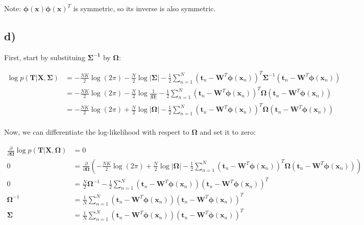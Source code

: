 \documentclass[12pt,a4paper,oneside]{paper}
\begin{document}
Note: $\mathbf{\phi}(\bm{x}) \mathbf{\phi}(\bm{x})^T$ is symmetric, so its inverse is also symmetric.

\newpage
\subsection*{d)}

First, start by substituing \( \mathbf{\Sigma^{-1}} \) by $\mathbf{\Omega}$:

\begin{align*}
\log p(\mathbf{T} | \mathbf{X}, \mathbf{\Sigma}) &= -\frac{NK}{2} \log(2\pi) - \frac{N}{2} \log |\mathbf{\Sigma}| - \frac{1}{2} \sum_{n=1}^{N} (\bm{t}_n - \mathbf{W}^T \mathbf{\phi}(\bm{x}_n))^T \mathbf{\Sigma}^{-1} (\bm{t}_n - \mathbf{W}^T \mathbf{\phi}(\bm{x}_n)) \\
&= -\frac{NK}{2} \log(2\pi) - \frac{N}{2} \log \frac{1}{|\mathbf{\Omega}|} - \frac{1}{2} \sum_{n=1}^{N} (\bm{t}_n - \mathbf{W}^T \mathbf{\phi}(\bm{x}_n))^T \mathbf{\Omega} (\bm{t}_n - \mathbf{W}^T \mathbf{\phi}(\bm{x}_n)) \\
&= -\frac{NK}{2} \log(2\pi) + \frac{N}{2} \log |\mathbf{\Omega}| - \frac{1}{2} \sum_{n=1}^{N} (\bm{t}_n - \mathbf{W}^T \mathbf{\phi}(\bm{x}_n))^T \mathbf{\Omega} (\bm{t}_n - \mathbf{W}^T \mathbf{\phi}(\bm{x}_n)) \\
\end{align*}

Now, we can differentiate the log-likelihood with respect to \( \mathbf{\Omega} \) and set it to zero:

\begin{align*}
\frac{\partial}{\partial \mathbf{\Omega}} \log p(\mathbf{T} | \mathbf{X}, \mathbf{\Omega}) &= 0 \\
0 &= \frac{\partial}{\partial \mathbf{\Omega}} \left( -\frac{NK}{2} \log(2\pi) + \frac{N}{2} \log |\mathbf{\Omega}| - \frac{1}{2} \sum_{n=1}^{N} (\bm{t}_n - \mathbf{W}^T \mathbf{\phi}(\bm{x}_n))^T \mathbf{\Omega} (\bm{t}_n - \mathbf{W}^T \mathbf{\phi}(\bm{x}_n)) \right)  \\
0 &= \frac{N}{2} \mathbf{\Omega}^{-1} - \frac{1}{2} \sum_{n=1}^{N} (\bm{t}_n - \mathbf{W}^T \mathbf{\phi}(\bm{x}_n)) (\bm{t}_n - \mathbf{W}^T \mathbf{\phi}(\bm{x}_n))^T \\
\mathbf{\Omega}^{-1} &= \frac{1}{N} \sum_{n=1}^{N} (\bm{t}_n - \mathbf{W}^T \mathbf{\phi}(\bm{x}_n)) (\bm{t}_n - \mathbf{W}^T \mathbf{\phi}(\bm{x}_n))^T \\
\mathbf{\Sigma} &= \frac{1}{N} \sum_{n=1}^{N} (\bm{t}_n - \mathbf{W}^T \mathbf{\phi}(\bm{x}_n)) (\bm{t}_n - \mathbf{W}^T \mathbf{\phi}(\bm{x}_n))^T \\
\end{align*}
\end{document}
